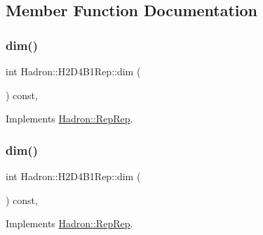 \subsection{Member Function Documentation}
\mbox{\label{structHadron_1_1H2D4B1Rep_af795d001f668da987faaaf60a84878bb}} 
\subsubsection{\texorpdfstring{dim()}{dim()}\hspace{0.1cm}{\footnotesize\ttfamily [1/5]}}
{\footnotesize\ttfamily int Hadron\+::\+H2\+D4\+B1\+Rep\+::dim (\begin{DoxyParamCaption}{ }\end{DoxyParamCaption}) const\hspace{0.3cm}{\ttfamily [inline]}, {\ttfamily [virtual]}}



Implements \mbox{\hyperlink{structHadron_1_1RepRep_a92c8802e5ed7afd7da43ccfd5b7cd92b}{Hadron\+::\+Rep\+Rep}}.

\mbox{\label{structHadron_1_1H2D4B1Rep_af795d001f668da987faaaf60a84878bb}} 
\subsubsection{\texorpdfstring{dim()}{dim()}\hspace{0.1cm}{\footnotesize\ttfamily [2/5]}}
{\footnotesize\ttfamily int Hadron\+::\+H2\+D4\+B1\+Rep\+::dim (\begin{DoxyParamCaption}{ }\end{DoxyParamCaption}) const\hspace{0.3cm}{\ttfamily [inline]}, {\ttfamily [virtual]}}



Implements \mbox{\hyperlink{structHadron_1_1RepRep_a92c8802e5ed7afd7da43ccfd5b7cd92b}{Hadron\+::\+Rep\+Rep}}.

\mbox{\label{structHadron_1_1H2D4B1Rep_af795d001f668da987faaaf60a84878bb}} 
